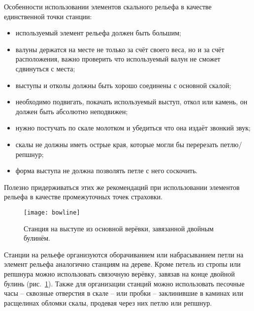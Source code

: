 \documentclass[fleqn, 12pt]{extarticle}
\begin{document}
    Особенности использовании элементов скального рельефа в качестве единственной точки станции:
    \begin{itemize}
        \item используемый элемент рельефа должен быть большим;
        \item валуны держатся на месте не только за счёт своего веса, но и за счёт расположения, важно проверить что используемый валун не сможет сдвинуться с места;
        \item выступы и отколы должны быть хорошо соединены с основной скалой;
        \item необходимо подвигать, покачать используемый выступ, откол или камень, он должен быть абсолютно неподвижен;
        \item нужно постучать по скале молотком и убедиться что она издаёт звонкий звук;
        \item скалы не должны иметь острые края, которые могли бы перерезать петлю/репшнур;
        \item форма выступа не должна позволять петле с него соскочить.
    \end{itemize}
    
    Полезно придерживаться этих же рекомендаций при использовании элементов рельефа в качестве промежуточных точек страховки.
    \begin{figure}[h]
        \centering
        \texttt{[image: bowline]}
        \caption{Станция на выступе из основной верёвки, завязанной двойным булинём.}\label{fig:bowline}
    \end{figure}
    
    Станции на рельефе организуются оборачиванием или набрасыванием петли на элемент рельефа аналогично станциям на дереве. Кроме петель из стропы или репшнура можно использовать
    связочную верёвку, завязав на конце двойной булинь (рис.~\ref{fig:bowline}). Также для организации станций можно использовать песочные часы -- сквозные отверстия в скале --
    или пробки -- заклинившие в каминах или расщелинах обломки скалы, продевая через них петлю или репшнур.
\end{document}
